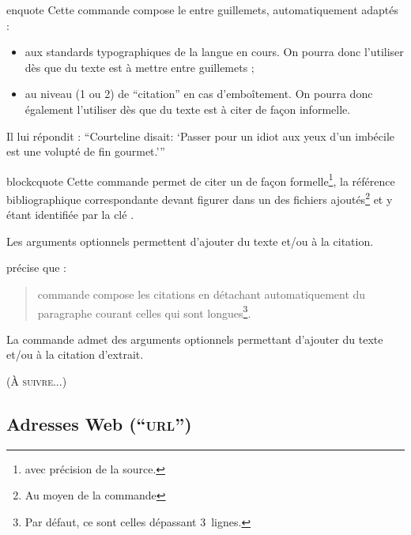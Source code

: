 \begin{docCommand}{enquote}{}
  Cette commande compose le  entre guillemets, automatiquement
  adaptés :
  \begin{itemize}
  \item aux standards typographiques de la langue en cours. On pourra donc
    l'utiliser dès que du texte est à mettre entre guillemets ;
  \item au niveau (1 ou 2) de \enquote{citation} en cas d'emboîtement. On
    pourra donc également l'utiliser dès que du texte est à citer de façon
    informelle.
  \end{itemize}
\begin{bodycode}
Il lui répondit : \enquote{Courteline disait: \enquote{Passer
    pour un idiot aux yeux d'un imbécile est une volupté de fin
    gourmet.}}
\end{bodycode}
\end{docCommand}

\begin{docCommand}{blockcquote}{}
  Cette commande permet de citer un  de façon
  formelle\footnote{\Ie*{} avec précision de la source.}, la référence
  bibliographique correspondante devant figurer dans un des fichiers 
  ajoutés\footnote{Au moyen de la commande } et
  y étant identifiée par la clé .

  Les arguments optionnels permettent d'ajouter du texte  et/ou
   à la citation.
\begin{bodycode}
\citeauthor{Bitouze} précise que :
\blockcquote{Bitouze}{%
   commande compose les citations en détachant
  automatiquement du paragraphe courant celles qui sont
  longues\footnote{Par défaut, ce sont celles
    dépassant 3~lignes.}.%
}.
\end{bodycode}
\end{docCommand}

La commande  admet des arguments optionnels permettant
d'ajouter du texte  et/ou  à la citation
d'extrait\autocite[Pour plus de détails, cf. par exemple][]{Bitouze}.

(\textsc{À suivre...})

\subsection{Adresses Web (\enquote{\textsc{url}})}
\label{sec-url}

